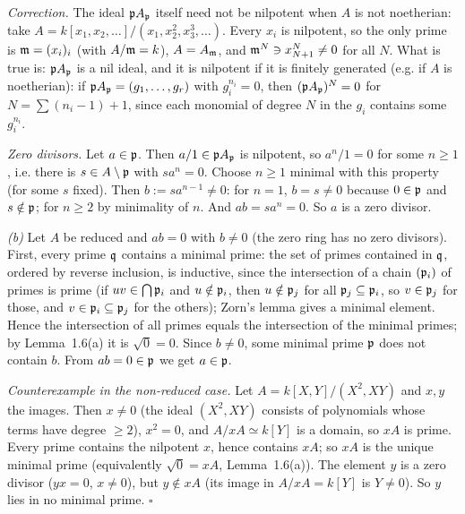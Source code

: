 \documentclass[11pt]{article}
\begin{document}
\emph{Correction.} The ideal $\mathfrak p A_\mathfrak p$ itself need not be nilpotent when $A$ is not noetherian: take $A=k[x_1,x_2,\dots]/(x_1,x_2^2,x_3^3,\dots)$. Every $x_i$ is nilpotent, so the only prime is $\mathfrak m=(x_i)_i$ (with $A/\mathfrak m=k$), $A=A_\mathfrak m$, and $\mathfrak m^N\ni x_{N+1}^N\neq0$ for all $N$. What is true is: $\mathfrak p A_\mathfrak p$ is a nil ideal, and it is nilpotent if it is finitely generated (e.g. if $A$ is noetherian): if $\mathfrak p A_\mathfrak p=(g_1,\dots,g_r)$ with $g_i^{n_i}=0$, then $(\mathfrak p A_\mathfrak p)^{N}=0$ for $N=\sum(n_i-1)+1$, since each monomial of degree $N$ in the $g_i$ contains some $g_i^{n_i}$.

\emph{Zero divisors.} Let $a\in\mathfrak p$. Then $a/1\in\mathfrak p A_\mathfrak p$ is nilpotent, so $a^n/1=0$ for some $n\ge1$, i.e. there is $s\in A\setminus\mathfrak p$ with $sa^n=0$. Choose $n\ge1$ minimal with this property (for some $s$ fixed). Then $b:=sa^{n-1}\neq0$: for $n=1$, $b=s\neq0$ because $0\in\mathfrak p$ and $s\notin\mathfrak p$; for $n\ge2$ by minimality of $n$. And $ab=sa^n=0$. So $a$ is a zero divisor.

\emph{(b)} Let $A$ be reduced and $ab=0$ with $b\neq0$ (the zero ring has no zero divisors). First, every prime $\mathfrak q$ contains a minimal prime: the set of primes contained in $\mathfrak q$, ordered by reverse inclusion, is inductive, since the intersection of a chain $(\mathfrak p_i)$ of primes is prime (if $uv\in\bigcap\mathfrak p_i$ and $u\notin\mathfrak p_i$, then $u\notin\mathfrak p_j$ for all $\mathfrak p_j\subseteq\mathfrak p_i$, so $v\in\mathfrak p_j$ for those, and $v\in\mathfrak p_i\subseteq\mathfrak p_j$ for the others); Zorn's lemma gives a minimal element. Hence the intersection of all primes equals the intersection of the minimal primes; by Lemma~1.6(a) it is $\sqrt0=0$. Since $b\neq0$, some minimal prime $\mathfrak p$ does not contain $b$. From $ab=0\in\mathfrak p$ we get $a\in\mathfrak p$.

\emph{Counterexample in the non-reduced case.} Let $A=k[X,Y]/(X^2,XY)$ and $x,y$ the images. Then $x\neq0$ (the ideal $(X^2,XY)$ consists of polynomials whose terms have degree $\ge2$), $x^2=0$, and $A/xA\simeq k[Y]$ is a domain, so $xA$ is prime. Every prime contains the nilpotent $x$, hence contains $xA$; so $xA$ is the unique minimal prime (equivalently $\sqrt 0=xA$, Lemma~1.6(a)). The element $y$ is a zero divisor ($yx=0$, $x\ne0$), but $y\notin xA$ (its image in $A/xA=k[Y]$ is $Y\neq0$). So $y$ lies in no minimal prime. \hfill$\square$
\end{document}
